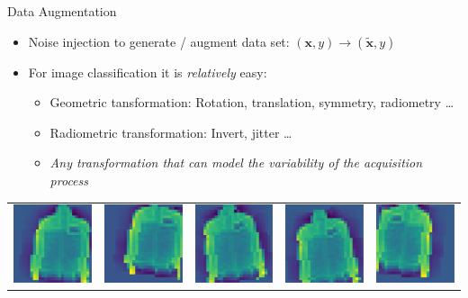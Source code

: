 \documentclass[pressentation,10pt,aspectratio=169,xcolor=table, colorlinks=true]{beamer}
\begin{document}
  \begin{frame}{Data Augmentation}
    \begin{itemize}
    \item Noise injection to generate / augment data set: \((\mathbf{x}, y) \rightarrow (\tilde{\mathbf{x}}, y)\)
    \item For image classification it is \emph{relatively} easy:
      \begin{itemize}
      \item Geometric tansformation: Rotation, translation, symmetry, radiometry \ldots
      \item Radiometric transformation: Invert, jitter \ldots
      \item \emph{Any transformation that can model the variability of the acquisition process}
      \end{itemize}
    \end{itemize}
  
  \begin{center}
    \begin{tabular}{c@{~}c@{~}c@{~}c@{~}c}
      \includegraphics[width=0.2\linewidth]{figures/data_augment_0.pdf}&         \includegraphics[width=0.2\linewidth]{figures/data_augment_1.pdf}&        \includegraphics[width=0.2\linewidth]{figures/data_augment_2.pdf}&        \includegraphics[width=0.2\linewidth]{figures/data_augment_3.pdf}&        \includegraphics[width=0.2\linewidth]{figures/data_augment_4.pdf}
    \end{tabular}
  \end{center}
 

\end{frame}
\end{document}
